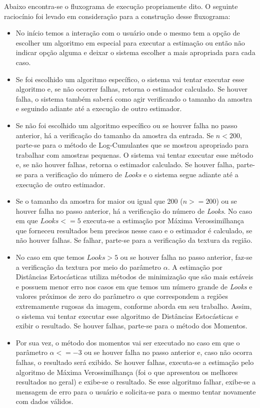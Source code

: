 Abaixo encontra-se o fluxograma de execução propriamente dito. O seguinte raciocínio foi levado em consideração para a construção desse fluxograma:
\begin{itemize}
    \item No início temos a interação com o usuário onde o mesmo tem a opção de escolher um algoritmo em especial para executar a estimação ou então não indicar opção alguma e deixar o sistema escolher a mais apropriada para cada caso.
    \item Se foi escolhido um algoritmo específico, o sistema vai tentar executar esse algoritmo e, se não ocorrer falhas, retorna o estimador calculado. Se houver falha, o sistema também saberá como agir verificando o tamanho da amostra e seguindo adiante até a execução de outro estimador.
    \item Se não foi escolhido um algoritmo específico ou se houver falha no passo anterior, há a verificação do tamanho da amostra da entrada. Se $n < 200$, parte-se para o método de Log-Cumulantes que se mostrou apropriado para trabalhar com amostras pequenas. O sistema vai tentar executar esse método e, se não houver falhas, retorna o estimador calculado. Se houver falha, parte-se para a verificação do número de \textit{Looks} e o sistema segue adiante até a execução de outro estimador.
    \item Se o tamanho da amostra for maior ou igual que 200 ($n >= 200$) ou se houver falha no passo anterior, há a verificação do número de \textit{Looks}. No caso em que $Looks <= 5$ executa-se a estimação por Máxima Verossimilhança que forneceu resultados bem precisos nesse caso e o estimador é calculado, se não houver falhas. Se falhar, parte-se para a verificação da textura da região.
    \item No caso em que temos $Looks > 5$ ou se houver falha no passo anterior, faz-se a verificação da textura por meio do parâmetro $\alpha$. A estimação por Distâncias Estocásticas utiliza métodos de minimização que são mais estáveis e possuem menor erro nos casos em que temos um número grande de \textit{Looks} e valores próximos de zero do parâmetro $\alpha$ que correspondem a regiões extremamente rugosas da imagem, conforme aborda \citet{Cassetti2013} em seu trabalho. Assim, o sistema vai tentar executar esse algoritmo de Distâncias Estocásticas e exibir o resultado. Se houver falhas, parte-se para o método dos Momentos. 
    \item Por sua vez, o método dos momentos vai ser executado no caso em que o parâmetro $\alpha <= -3$ ou se houver falha no passo anterior e, caso não ocorra falhas, o resultado será exibido. Se houver falhas, executa-se a estimação pelo algoritmo de Máxima Verossimilhança (foi o que apresentou os melhores resultados no geral) e exibe-se o resultado. Se esse algoritmo falhar, exibe-se a mensagem de erro para o usuário e solicita-se para o mesmo tentar novamente com dados válidos.
    
\end{itemize}
